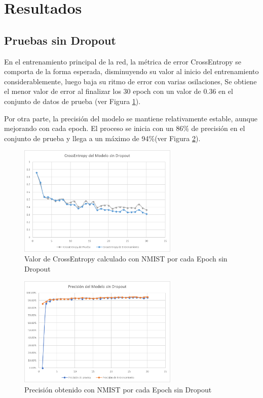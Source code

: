 \documentclass[journal]{IEEEtran}
\begin{document}
\section{Resultados}

\subsection{ Pruebas sin Dropout}
En el entrenamiento principal de la red, la métrica de error CrossEntropy se comporta de la forma esperada, disminuyendo su valor al inicio del entrenamiento considerablemente, luego baja su ritmo de error con varias osilaciones, Se obtiene el menor valor de error al finalizar los 30 epoch con un valor de 0.36 en el conjunto de datos de prueba (ver Figura \ref{crossentropySinDrop}).

Por otra parte, la precisión del modelo se mantiene relativamente estable, aunque mejorando con cada epoch. El proceso se inicia con un 86\% de precisión en el conjunto de prueba y llega a un máximo de 94\%(ver Figura \ref{precisionSinDrop}). 

\begin{figure}[!t]
\centering
\includegraphics[width=3in]{crossentropySinDrop.png}
\caption{Valor de CrossEntropy calculado con NMIST por cada Epoch sin Dropout}
\label{crossentropySinDrop}
\end{figure}

\begin{figure}[!t]
\centering
\includegraphics[width=3in]{precisionSinDrop.png}
\caption{Precisión obtenido con NMIST por cada Epoch sin Dropout}
\label{precisionSinDrop}
\end{figure}
\end{document}
